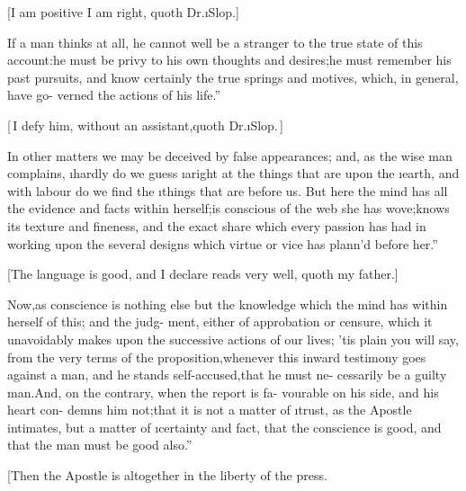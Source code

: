 \documentclass[twoside]{article}
\begin{document}
[I am positive I am right, quoth Dr.\@ \i{Slop.}]

\lqq If a man thinks at all, he cannot\break
\lqq well be a stranger to the true state of\break
\lqq this account:\tsk he must be privy to\break
\lqq his own thoughts and desires;\tsh he\break
\lqq must remember his past pursuits, and\break
\lqq know certainly the true springs and\break
\lqq motives, which, in general, have go-\break
\lqq verned the actions of his life.”

[\,I defy him, without an assistant,\break quoth Dr.\@ \i{Slop.}\,]

\indent\lqq In other matters we may be deceived\break
\lqq by false appearances; and, as the wise\break
\lqq man complains, \i{hardly do we guess}\break
\lqq\i{aright at the things that are upon the}\break
\lqq\i{earth, and with labour do we find the}\break
\lqq\i{things that are before us}. But here the\break
\lqq mind has all the evidence and facts\break
\lqq within herself;\tsk is conscious of the web\break
\lqq she has wove;\tsk knows its texture and
\lqq fineness, and the exact share which\break
\lqq every passion has had in working upon\break
\lqq the several designs which virtue or vice\break
\lqq has plann’d before her.”

[The language is good, and I declare \trim reads very
well, quoth my father.]

\lqq Now,\tsk as conscience is nothing else\break
\lqq but the knowledge which the mind has\break
\lqq within herself of this; and the judg-\break
\lqq ment, either of approbation or censure,\break
\lqq which it unavoidably makes upon the\break
\lqq successive actions of our lives; ’tis plain\break
\lqq you will say, from the very terms of\break
\lqq the proposition,\tsk whenever this inward\break
\lqq testimony goes against a man, and he\break
\lqq stands self-accused,\tsk that he must ne-\break
\lqq cessarily be a guilty man.\tsk And, on\break
\lqq the contrary, when the report is fa-\break
\lqq vourable on his side, and his heart con-
\lqq demns him not;\tsh that it is not a\break
\lqq matter of \i{trust}, as the Apostle intimates,\break
\lqq \tsk but a matter of \i{certainty} and fact,\break
\lqq that the conscience is good, and that\break
\lqq the man must be good also.”

[Then the Apostle is altogether in the 
liberty of the press.
\end{document}
